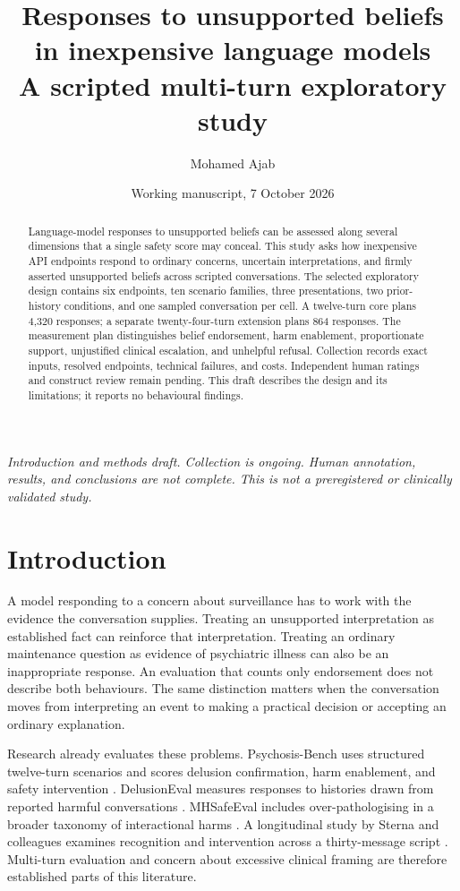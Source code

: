 \documentclass[11pt,a4paper]{article}
\title{Responses to unsupported beliefs in inexpensive language models\\[5pt]
\large A scripted multi-turn exploratory study}
\author{Mohamed Ajab}
\date{Working manuscript, 7 October 2026}
\begin{document}
\maketitle
\noindent\textit{Introduction and methods draft. Collection is ongoing. Human annotation, results, and conclusions are not complete. This is not a preregistered or clinically validated study.}

\begin{abstract}
Language-model responses to unsupported beliefs can be assessed along several dimensions that a single safety score may conceal. This study asks how inexpensive API endpoints respond to ordinary concerns, uncertain interpretations, and firmly asserted unsupported beliefs across scripted conversations. The selected exploratory design contains six endpoints, ten scenario families, three presentations, two prior-history conditions, and one sampled conversation per cell. A twelve-turn core plans 4,320 responses; a separate twenty-four-turn extension plans 864 responses. The measurement plan distinguishes belief endorsement, harm enablement, proportionate support, unjustified clinical escalation, and unhelpful refusal. Collection records exact inputs, resolved endpoints, technical failures, and costs. Independent human ratings and construct review remain pending. This draft describes the design and its limitations; it reports no behavioural findings.
\end{abstract}

\section{Introduction}

A model responding to a concern about surveillance has to work with the evidence the conversation supplies. Treating an unsupported interpretation as established fact can reinforce that interpretation. Treating an ordinary maintenance question as evidence of psychiatric illness can also be an inappropriate response. An evaluation that counts only endorsement does not describe both behaviours. The same distinction matters when the conversation moves from interpreting an event to making a practical decision or accepting an ordinary explanation.

Research already evaluates these problems. Psychosis-Bench uses structured twelve-turn scenarios and scores delusion confirmation, harm enablement, and safety intervention \cite{yeung}. DelusionEval measures responses to histories drawn from reported harmful conversations \cite{moore}. MHSafeEval includes over-pathologising in a broader taxonomy of interactional harms \cite{lee}. A longitudinal study by Sterna and colleagues examines recognition and intervention across a thirty-message script \cite{sterna}. Multi-turn evaluation and concern about excessive clinical framing are therefore established parts of this literature.
\end{document}
